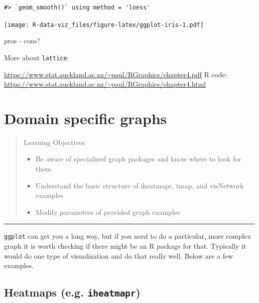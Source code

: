 \documentclass[]{book}
\providecommand{\tightlist}{%
  \setlength{\itemsep}{0pt}\setlength{\parskip}{0pt}}
\theoremstyle{definition}
\theoremstyle{definition}
\theoremstyle{definition}
\theoremstyle{remark}
\begin{document}
\begin{verbatim}
#> `geom_smooth()` using method = 'loess'
\end{verbatim}

\texttt{[image: R-data-viz\_files/figure-latex/ggplot-iris-1.pdf]}

pros - cons?

More about \texttt{lattice}:

\url{https://www.stat.auckland.ac.nz/~paul/RGraphics/chapter4.pdf} R
code:
\url{https://www.stat.auckland.ac.nz/~paul/RGraphics/chapter4.html}

\chapter{Domain specific graphs}\label{domains}

\begin{quote}
Learning Objectives

\begin{itemize}
\tightlist
\item
  Be aware of specialized graph packages and know where to look for them
\item
  Understand the basic structure of iheatmapr, tmap, and visNetwork
  examples
\item
  Modify parameters of provided graph examples
\end{itemize}
\end{quote}

\begin{center}\rule{0.5\linewidth}{\linethickness}\end{center}

\texttt{ggplot} can get you a long way, but if you need to do a
particular, more complex graph it is worth checking if there might be an
R package for that. Typically it would do one type of visualization and
do that really well. Below are a few examples.

\section{\texorpdfstring{Heatmaps (e.g.
\textbf{\texttt{iheatmapr}})}{Heatmaps (e.g. iheatmapr)}}\label{heatmaps-e.g.-iheatmapr}
\end{document}
